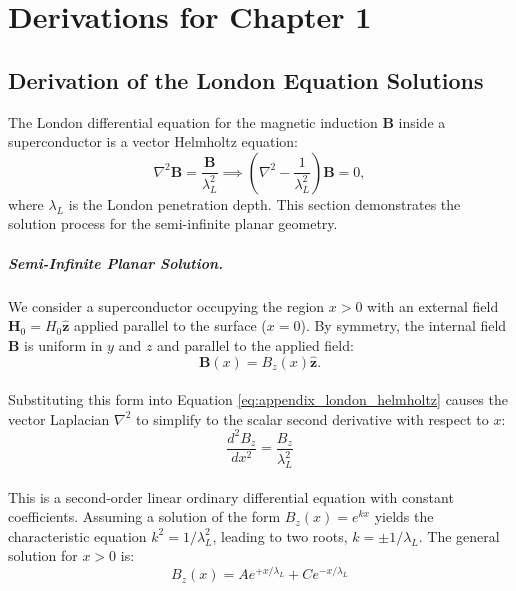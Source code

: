 \appendix
\label{Appendix - Calculations}

\chapter{Derivations for Chapter 1}
\label{app:supercond-derivation}
\section*{Derivation of the London Equation Solutions}
\label{app:london_derivation}

The London differential equation for the magnetic induction $\mathbf{B}$ inside a superconductor is a vector Helmholtz equation:
\begin{equation}
    \nabla^2 \mathbf{B} = \frac{\mathbf{B}}{\lambda_L^2} \implies \left(\nabla^2 - \frac{1}{\lambda_L^2}\right) \mathbf{B} = 0,
    \label{eq:appendix_london_helmholtz}
\end{equation}
where $\lambda_L$ is the London penetration depth. This section demonstrates the solution process for the semi-infinite planar geometry.

\paragraph{Semi-Infinite Planar Solution.}
\label{app:planar_solution}

We consider a superconductor occupying the region $x > 0$ with an external field $\mathbf{H}_0 = H_0 \hat{\mathbf{z}}$ applied parallel to the surface ($x=0$). By symmetry, the internal field $\mathbf{B}$ is uniform in $y$ and $z$ and parallel to the applied field:
$$\mathbf{B}(x) = B_z(x) \hat{\mathbf{z}}.$$\\
Substituting this form into Equation \eqref{eq:appendix_london_helmholtz} causes the vector Laplacian $\nabla^2$ to simplify to the scalar second derivative with respect to $x$:
$$\frac{d^2 B_z}{dx^2} = \frac{B_z}{\lambda_L^2}$$\\
This is a second-order linear ordinary differential equation with constant coefficients. Assuming a solution of the form $B_z(x) = e^{kx}$ yields the characteristic equation $k^2 = 1/\lambda_L^2$, leading to two roots, $k = \pm 1/\lambda_L$. The general solution for $x>0$ is:
$$B_z(x) = A e^{+x/\lambda_L} + C e^{-x/\lambda_L}$$

